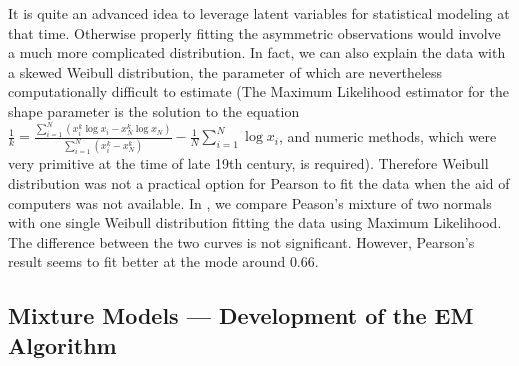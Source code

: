 It is quite an advanced idea to leverage latent variables for statistical
modeling at that time. Otherwise properly fitting the asymmetric observations
would involve a much more complicated distribution. In fact, we can also explain
the data with a skewed Weibull distribution, the parameter of which are
nevertheless computationally difficult to estimate (The Maximum Likelihood
estimator for the shape parameter is the solution to the equation $\frac{1}{k} =
\frac{\sum_{i=1}^N (x_i^k\log x_i - x_N^k \log x_N) }{\sum_{i=1}^N (x_i^k -
x_N^k)}- \frac{1}{N}\sum\limits_{i=1}^N \log x_i$, and numeric methods, which
were very primitive at the time of late 19th century, is required). Therefore
Weibull distribution was not a practical option for Pearson to fit the data when
the aid of computers was not available. In , we
compare Peason's mixture of two normals with one single Weibull distribution
fitting the data using Maximum Likelihood. The difference between the two curves
is not significant. However, Pearson's result seems to fit better at the mode
around $0.66$.

\subsection{Mixture Models --- Development of the EM Algorithm}

